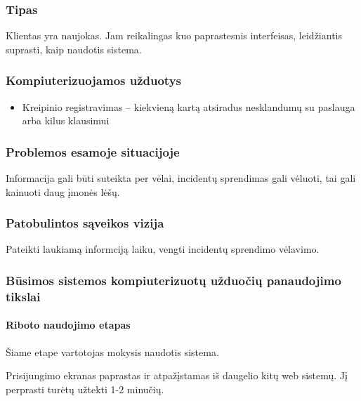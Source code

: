 {{		\subsubsection{Tipas}
		
		Klientas yra naujokas. Jam reikalingas kuo paprastesnis interfeisas, leidžiantis suprasti, kaip naudotis sistema.
		
		\subsubsection{Kompiuterizuojamos užduotys}
		
		\begin{itemize}
			\item Kreipinio registravimas – kiekvieną kartą atsiradus nesklandumų su paslauga arba kilus klausimui
		\end{itemize}
		
		\subsubsection{Problemos esamoje situacijoje}
		
		Informacija gali būti suteikta per vėlai, incidentų sprendimas gali vėluoti, tai gali kainuoti daug įmonės lėšų.
		
		\subsubsection{Patobulintos sąveikos vizija}
		
		Pateikti laukiamą informciją laiku, vengti incidentų sprendimo vėlavimo.
		
		\subsubsection{Būsimos sistemos kompiuterizuotų užduočių panaudojimo tikslai}
		
			\setcounter{tocdepth}{5} \setcounter{secnumdepth}{5}
			
			\paragraph{Riboto naudojimo etapas}
			
			Šiame etape vartotojas mokysis naudotis sistema.
			
			Prisijungimo ekranas paprastas ir atpažįstamas iš daugelio kitų web sistemų.
			Jį perprasti turėtų užtekti 1-2 minučių.

}}
